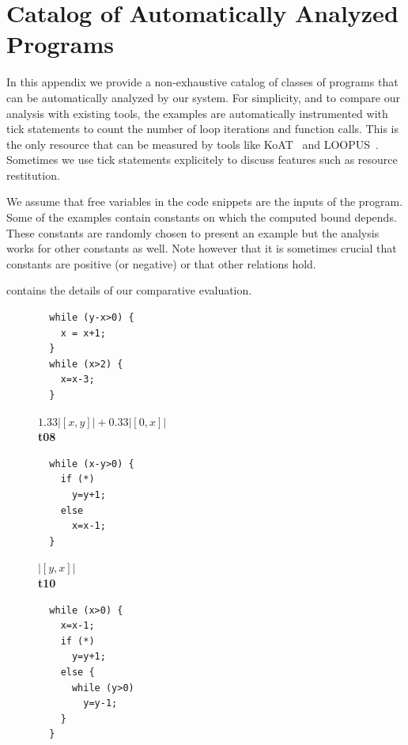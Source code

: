 \documentclass[nocopyrightspace,preprint,pldi]{sigplanconf-pldi15}
\newcommand{\pref}[1]{\prettyref{#1}}
\begin{document}
{\section{Catalog of Automatically Analyzed Programs}
\label{app:cat}

In this appendix we provide a non-exhaustive catalog of classes of
programs that can be automatically analyzed by our system.  For
simplicity, and to compare our analysis with existing tools,
the examples are automatically instrumented with tick statements
to count the number of loop iterations and function calls.
This is the only resource that can be measured by tools like
KoAT~\cite{BrockschmidtEFFG14} and LOOPUS~\cite{SinnZV14}.  Sometimes
we use tick statements explicitely to discuss features such as
resource restitution.

We assume that free variables in the code snippets are the inputs of
the program. Some of the examples contain constants on which the
computed bound depends.  These constants are randomly chosen to
present an example but the analysis works for other constants as well.
Note however that it is sometimes crucial that constants are positive
(or negative) or that other relations hold.

\pref{tab:eval} contains the details of our comparative evaluation.


\begin{figure}
\setlength{\progwidth}{.24\linewidth}
  \centering

  \begin{minipage}[b]{\progwidth}
    \begin{center}
   \begin{lstlisting}
  while (y-x>0) {
    x = x+1;
  }
  while (x>2) {
    x=x-3;
  }
   \end{lstlisting}

$1.33|[x,y]| + 0.33|[0,x]|$
\\[.7\baselineskip]
      {\bf t08}
    \end{center}
  \end{minipage}
%
%
%
  \begin{minipage}[b]{\progwidth}
    \begin{center}
   \begin{lstlisting}
  while (x-y>0) {
    if (*)
      y=y+1;
    else
      x=x-1;
  }
   \end{lstlisting}

$|[y,x]|$
\\[.7\baselineskip]
      {\bf t10}
    \end{center}
  \end{minipage}
%
%
%
  \begin{minipage}[b]{\progwidth}
    \begin{center}
   \begin{lstlisting}
  while (x>0) {
    x=x-1;
    if (*)
      y=y+1;
    else {
      while (y>0)
        y=y-1;
    }
  }
   \end{lstlisting}


\end{center}
\end{minipage}
\end{figure}}
\end{document}
